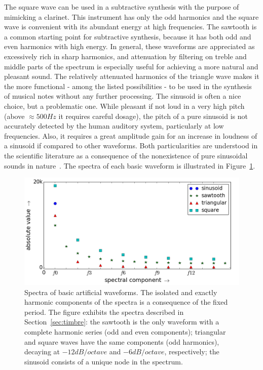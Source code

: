 The square wave can be used in a subtractive synthesis with the purpose of mimicking a clarinet.
This instrument has only the odd harmonics and the square wave is convenient with its abundant energy at high frequencies.
The sawtooth is a common starting point for subtractive synthesis,
because it has both odd and even harmonics with high energy.
In general, these waveforms are appreciated as excessively rich in sharp harmonics,
and attenuation by filtering on treble and middle parts of the spectrum is 
especially useful for achieving a more natural and pleasant sound. 
The relatively attenuated harmonics of the triangle wave makes it the more functional 
- among the listed possibilities - to be used in the synthesis of musical notes without any further processing.
The sinusoid is often a nice choice, but a problematic one.
While pleasant if not loud in a very high pitch (above $\approx 500Hz$ it requires careful dosage),
the pitch of a pure sinusoid is not accurately detected by the human auditory system,
particularly at low frequencies.
Also, it requires a great amplitude gain for an increase in loudness of a sinusoid
if compared to other waveforms. Both particularities are understood in the scientific
literature as a consequence of the nonexistence of pure sinusoidal sounds in nature~\cite{Roederer}.
The spectra of each basic waveform is illustrated in Figure~\ref{fig:espectroDeOndas}.

\begin{figure}
    \centering
        \includegraphics[width=.7\textwidth]{figures/waveSpectrum_}
    \caption{Spectra of basic artificial waveforms.
The isolated and exactly harmonic components of the spectra is a consequence of the fixed period.
	The figure exhibits the spectra described in Section~\ref{sec:timbre}:
	the sawtooth is the only waveform with a complete harmonic series (odd and even components);
	triangular and square waves have the same components (odd harmonics), decaying at $-12dB/octave$ and $-6dB/octave$, respectively;
	the sinusoid consists of a unique node in the spectrum.
	}
        \label{fig:espectroDeOndas}
\end{figure}

